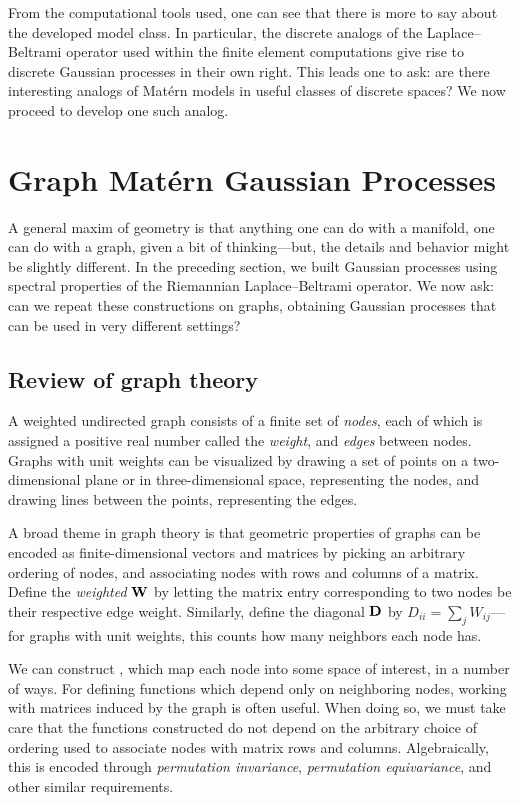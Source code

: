 \documentclass[11pt]{book}
\begin{document}
From the computational tools used, one can see that there is more to say about the developed model class.
In particular, the discrete analogs of the Laplace--Beltrami operator used within the finite element computations give rise to discrete Gaussian processes in their own right.
This leads one to ask: are there interesting analogs of Matérn models in useful classes of discrete spaces?
We now proceed to develop one such analog.

\section{Graph Matérn Gaussian Processes}

A general maxim of geometry is that anything one can do with a manifold, one can do with a graph, given a bit of thinking---but, the details and behavior might be slightly different.
In the preceding section, we built Gaussian processes using spectral properties of the Riemannian Laplace--Beltrami operator.
We now ask: can we repeat these constructions on graphs, obtaining Gaussian processes that can be used in very different settings?

\subsection{Review of graph theory}

A weighted undirected graph consists of a finite set of \emph{nodes}, each of which is assigned a positive real number called the \emph{weight}, and \emph{edges} between nodes.
Graphs with unit weights can be visualized by drawing a set of points on a two-dimensional plane or in three-dimensional space, representing the nodes, and drawing lines between the points, representing the edges.

A broad theme in graph theory is that geometric properties of graphs can be encoded as finite-dimensional vectors and matrices by picking an arbitrary ordering of nodes, and associating nodes with rows and columns of a matrix.
Define the \emph{weighted } $\m{W}$ by letting the matrix entry corresponding to two nodes be their respective edge weight.
Similarly, define the diagonal  $\m{D}$ by $D_{ii} = \sum_j W_{ij}$---for graphs with unit weights, this counts how many neighbors each node has.

We can construct , which map each node into some space of interest, in a number of ways.
For defining functions which depend only on neighboring nodes, working with matrices induced by the graph is often useful.
When doing so, we must take care that the functions constructed do not depend on the arbitrary choice of ordering used to associate nodes with matrix rows and columns. Algebraically, this is encoded through \emph{permutation invariance}, \emph{permutation equivariance}, and other similar requirements.
\end{document}

